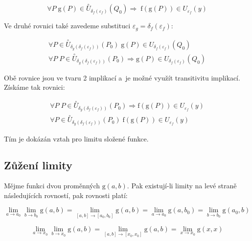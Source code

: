 \begin{equation}
\forall P \; \mathrm{g}(P) \in \overset{\circ}{U}_{\delta_f(\varepsilon_f)}(Q_0) \Rightarrow \; \mathrm{f}(\mathrm{g}(P)) \in U_{\varepsilon_f}(y)
\end{equation}

Ve druhé rovnici také zavedeme substituci \(\varepsilon_g = \delta_f(\varepsilon_f)\):

\begin{equation}
\begin{split}
\forall P \in \overset{\circ}{U}_{\delta_g(\delta_f(\varepsilon_f))}(P_0) \; \mathrm{g}(P) \in U_{\delta_f(\varepsilon_f)}(Q_0) \\
\forall P \; P \in \overset{\circ}{U}_{\delta_g(\delta_f(\varepsilon_f))}(P_0) \Rightarrow \mathrm{g}(P) \in U_{\delta_f(\varepsilon_f)}(Q_0)
\end{split}
\end{equation}

Obě rovnice jsou ve tvaru 2 implikací a~je možné využít transitivitu implikací. Získáme tak rovnici:

\begin{equation}
\begin{split}
\forall P \; P \in \overset{\circ}{U}_{\delta_g(\delta_f(\varepsilon_f))}(P_0) \Rightarrow \mathrm{f}(\mathrm{g}(P)) \in U_{\varepsilon_f}(y) \\
\forall P \in \overset{\circ}{U}_{\delta_g(\delta_f(\varepsilon_f))}(P_0) \; \mathrm{f}(\mathrm{g}(P)) \in U_{\varepsilon_f}(y)
\end{split}
\end{equation}

Tím je dokázán vztah pro limitu složené funkce.

\subsection{Zůžení limity}

Mějme funkci dvou proměnných \(\mathrm{g}(a, b)\). Pak existují-li limity na levé straně následujících rovností, pak rovnosti platí:

\begin{equation}
\label{eq:zuzeni_limity_fixace}
\lim_{a \to a_0} \lim_{b \to b_0} \mathrm{g}(a, b) = \lim_{[a, b] \to [a_0, b_0]} \mathrm{g}(a, b) = \lim_{a \to a_0} \mathrm{g}(a, b_0) = \lim_{b \to b_0} \mathrm{g}(a_0, b)
\end{equation}

\begin{equation}
\label{eq:zuzeni_limity_stejne_promenne}
\lim_{a \to x_0} \lim_{b \to x_0} \mathrm{g}(a, b) = \lim_{[a, b] \to [x_0, x_0]} \mathrm{g}(a, b) = \lim_{x \to x_0} \mathrm{g}(x, x)
\end{equation}

